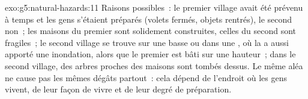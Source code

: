 \begin{solution}{exo:g5:natural-hazards:11}
Raisons possibles~: le premier village avait été prévenu à temps et les gens
s'étaient préparés (volets fermés, objets rentrés), le second non~; les
maisons du premier sont solidement construites, celles du second sont
fragiles~; le second village se trouve sur une  basse ou dans une
, où la  a aussi apporté une inondation, alors
que le premier est bâti sur une hauteur~; dans le second village, des
arbres proches des maisons sont tombés dessus. Le même aléa ne cause pas
les mêmes dégâts partout~: cela dépend de l'endroit où les gens vivent, de
leur façon de vivre et de leur degré de préparation.
\end{solution}
